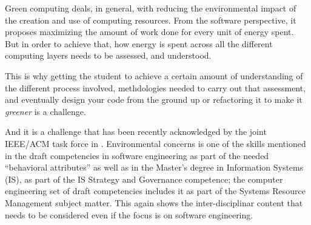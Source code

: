 \documentclass[sigconf]{acmart}
\begin{document}
Green computing \cite{kurp2008green} deals, in general, with reducing the
environmental impact of the creation and use of computing resources. From the
software perspective, it proposes maximizing the amount of work done for every
unit of energy spent. But in order to achieve that, how energy is spent across
all the different computing layers needs to be assessed, and understood.

This is why getting the student to achieve a certain amount of understanding of
the different process involved, methdologies needed to carry out that
assessment, and eventually design your code from the ground up or refactoring it
to make it {\em greener} is a challenge.

And it is a challenge that has been recently acknowledged by the joint IEEE/ACM
task force in \cite{cc2020}. Environmental concerns is one of the skills
mentioned in the draft competencies in software engineering as part of the
needed ``behavioral attributes'' as well as in the
Master's degree in Information Systems (IS), as part of the IS Strategy and
Governance competence; the computer engineering set of draft competencies
includes it as part of the Systems Resource Management subject matter. This
again shows the inter-disciplinar content that needs to be considered even if
the focus is on software engineering.



\end{document}
